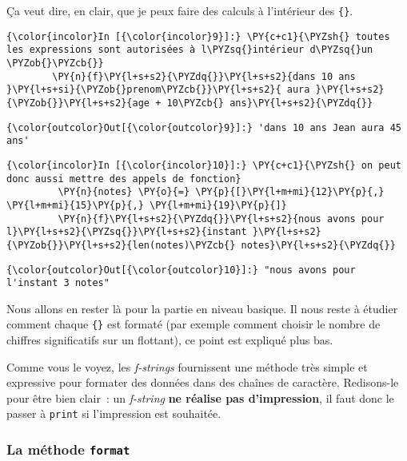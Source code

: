     Ça veut dire, en clair, que je peux faire des calculs à l'intérieur des
\texttt{\{\}}.

    \begin{Verbatim}[commandchars=\\\{\}]
{\color{incolor}In [{\color{incolor}9}]:} \PY{c+c1}{\PYZsh{} toutes les expressions sont autorisées à l\PYZsq{}intérieur d\PYZsq{}un \PYZob{}\PYZcb{}}
        \PY{n}{f}\PY{l+s+s2}{\PYZdq{}}\PY{l+s+s2}{dans 10 ans }\PY{l+s+si}{\PYZob{}prenom\PYZcb{}}\PY{l+s+s2}{ aura }\PY{l+s+s2}{\PYZob{}}\PY{l+s+s2}{age + 10\PYZcb{} ans}\PY{l+s+s2}{\PYZdq{}}
\end{Verbatim}


\begin{Verbatim}[commandchars=\\\{\}]
{\color{outcolor}Out[{\color{outcolor}9}]:} 'dans 10 ans Jean aura 45 ans'
\end{Verbatim}
            
    \begin{Verbatim}[commandchars=\\\{\}]
{\color{incolor}In [{\color{incolor}10}]:} \PY{c+c1}{\PYZsh{} on peut donc aussi mettre des appels de fonction}
         \PY{n}{notes} \PY{o}{=} \PY{p}{[}\PY{l+m+mi}{12}\PY{p}{,} \PY{l+m+mi}{15}\PY{p}{,} \PY{l+m+mi}{19}\PY{p}{]}
         \PY{n}{f}\PY{l+s+s2}{\PYZdq{}}\PY{l+s+s2}{nous avons pour l}\PY{l+s+s2}{\PYZsq{}}\PY{l+s+s2}{instant }\PY{l+s+s2}{\PYZob{}}\PY{l+s+s2}{len(notes)\PYZcb{} notes}\PY{l+s+s2}{\PYZdq{}}
\end{Verbatim}


\begin{Verbatim}[commandchars=\\\{\}]
{\color{outcolor}Out[{\color{outcolor}10}]:} "nous avons pour l'instant 3 notes"
\end{Verbatim}
            
    Nous allons en rester là pour la partie en niveau basique. Il nous reste
à étudier comment chaque \texttt{\{\}} est formaté (par exemple comment
choisir le nombre de chiffres significatifs sur un flottant), ce point
est expliqué plus bas.

Comme vous le voyez, les \emph{f-strings} fournissent une méthode très
simple et expressive pour formater des données dans des chaînes de
caractère. Redisons-le pour être bien clair~: un \emph{f-string}
\textbf{ne réalise pas d'impression}, il faut donc le passer à
\texttt{print} si l'impression est souhaitée.

    \hypertarget{la-muxe9thode-format}{%
\subsubsection{\texorpdfstring{La méthode
\texttt{format}}{La méthode format}}\label{la-muxe9thode-format}}

